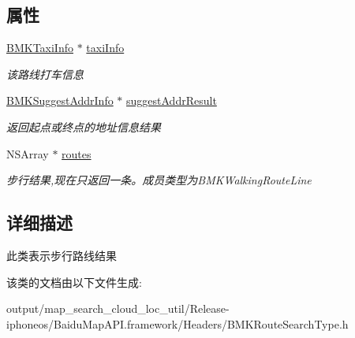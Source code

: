 \subsection*{属性}
\begin{DoxyCompactItemize}
\item 
\hypertarget{interface_b_m_k_walking_route_result_a64e1ed0711dbed93a53cce9f3fd5b477}{}\hyperlink{interface_b_m_k_taxi_info}{B\+M\+K\+Taxi\+Info} $\ast$ \hyperlink{interface_b_m_k_walking_route_result_a64e1ed0711dbed93a53cce9f3fd5b477}{taxi\+Info}\label{interface_b_m_k_walking_route_result_a64e1ed0711dbed93a53cce9f3fd5b477}

\begin{DoxyCompactList}\small\item\em 该路线打车信息 \end{DoxyCompactList}\item 
\hypertarget{interface_b_m_k_walking_route_result_aa609ce663bd13a0c2a96df209d3adc67}{}\hyperlink{interface_b_m_k_suggest_addr_info}{B\+M\+K\+Suggest\+Addr\+Info} $\ast$ \hyperlink{interface_b_m_k_walking_route_result_aa609ce663bd13a0c2a96df209d3adc67}{suggest\+Addr\+Result}\label{interface_b_m_k_walking_route_result_aa609ce663bd13a0c2a96df209d3adc67}

\begin{DoxyCompactList}\small\item\em 返回起点或终点的地址信息结果 \end{DoxyCompactList}\item 
\hypertarget{interface_b_m_k_walking_route_result_a5d3582bcf623a0a164e68d4bc9b329f3}{}N\+S\+Array $\ast$ \hyperlink{interface_b_m_k_walking_route_result_a5d3582bcf623a0a164e68d4bc9b329f3}{routes}\label{interface_b_m_k_walking_route_result_a5d3582bcf623a0a164e68d4bc9b329f3}

\begin{DoxyCompactList}\small\item\em 步行结果,现在只返回一条。成员类型为\+B\+M\+K\+Walking\+Route\+Line \end{DoxyCompactList}\end{DoxyCompactItemize}


\subsection{详细描述}
此类表示步行路线结果 

该类的文档由以下文件生成\+:\begin{DoxyCompactItemize}
\item 
output/map\+\_\+search\+\_\+cloud\+\_\+loc\+\_\+util/\+Release-\/iphoneos/\+Baidu\+Map\+A\+P\+I.\+framework/\+Headers/B\+M\+K\+Route\+Search\+Type.\+h\end{DoxyCompactItemize}
